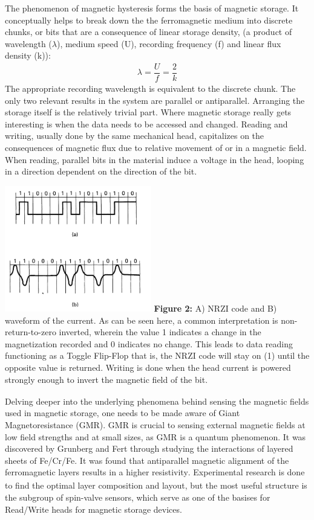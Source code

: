 \documentclass[11pt]{article}
\begin{document}
\begin{multicols}{2}
The phenomenon of magnetic hysteresis forms the basis of magnetic storage. It conceptually helps to break down the the ferromagnetic medium into discrete chunks, or bits that are a consequence of linear storage density, (a product of wavelength ($\lambda$), medium speed (U), recording frequency (f) and linear flux density (k)):
\begin{align*}
	\lambda= \dfrac{U}{f} = \dfrac{2}{k}
\end{align*}
The appropriate recording wavelength is equivalent to the discrete chunk. The only two relevant results in the system are parallel or antiparallel. Arranging the storage itself is the relatively trivial part. Where magnetic storage really gets interesting is when the data needs to be accessed and changed. Reading and writing, usually done by the same mechanical head, capitalizes on the consequences of magnetic flux due to relative movement of or in a magnetic field. When reading, parallel bits in the material induce a voltage in the head, looping in a direction dependent on the direction of the bit. 
\begin{center}
	\centering
	\includegraphics[width=0.48\textwidth]{Waveform_code.png}
	{\footnotesize\textbf{Figure 2:}  A) NRZI code and B) waveform of the current. As can be seen here, a common interpretation is non-return-to-zero inverted, wherein the value 1 indicates a change in the magnetization recorded and 0 indicates no change. This leads to data reading functioning as a Toggle Flip-Flop that is, the NRZI code will stay on (1) until the opposite value is returned. Writing is done when the head current is powered strongly enough to invert the magnetic field of the bit\textsubscript{\cite{label1}}}.
\end{center} 




Delving deeper into the underlying phenomena behind sensing the magnetic fields used in magnetic storage, one needs to be made aware of Giant Magnetoresistance (GMR). GMR is crucial to sensing external magnetic fields at low field strengths and at small sizes, as GMR is a quantum phenomenon. It was discovered by Grunberg and Fert through studying the interactions of layered sheets of Fe/Cr/Fe. It was found that antiparallel magnetic alignment of the ferromagnetic layers results in a higher resistivity\textsubscript{\cite{label5}}. Experimental research is done to find the optimal layer composition and layout, but the most useful structure is the subgroup of spin-valve sensors, which serve as one of the basises for Read/Write heads for magnetic storage devices.


\end{multicols}
\end{document}
